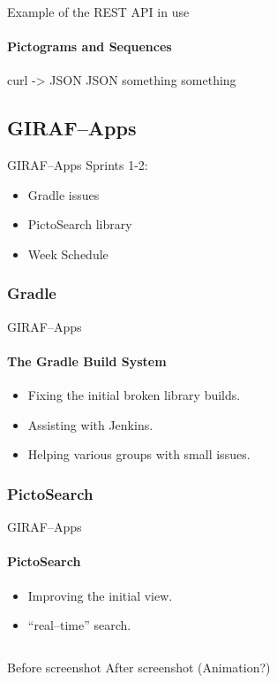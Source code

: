         \begin{frame}[t]{Example of the REST API in use}\framesubtitle{Pictograms and Sequences}
            curl -> JSON
            JSON something something
        \end{frame}

    \subsection{GIRAF--Apps}
        \begin{frame}[t]{GIRAF--Apps}
            Sprints 1-2:
            \begin{itemize}
                \item Gradle issues
                \item PictoSearch library
                \item Week Schedule
            \end{itemize}
        \end{frame}


        \subsubsection{Gradle}
            \begin{frame}[t]{GIRAF--Apps}\framesubtitle{The Gradle Build System}
                \begin{itemize}
                    \item Fixing the initial broken library builds.
                    \item Assisting with Jenkins.
                    \item Helping various groups with small issues.
                \end{itemize}
            \end{frame}

        \subsubsection{PictoSearch}
            \begin{frame}[t]{GIRAF--Apps}\framesubtitle{PictoSearch}
                \begin{itemize}
                    \item Improving the initial view.
                    \item \enquote{real--time} search.
                \end{itemize}
                \bigskip
                \begin{columns}[c]
                        Before screenshot
                        After screenshot (Animation?)
                \end{columns}
            \end{frame}


